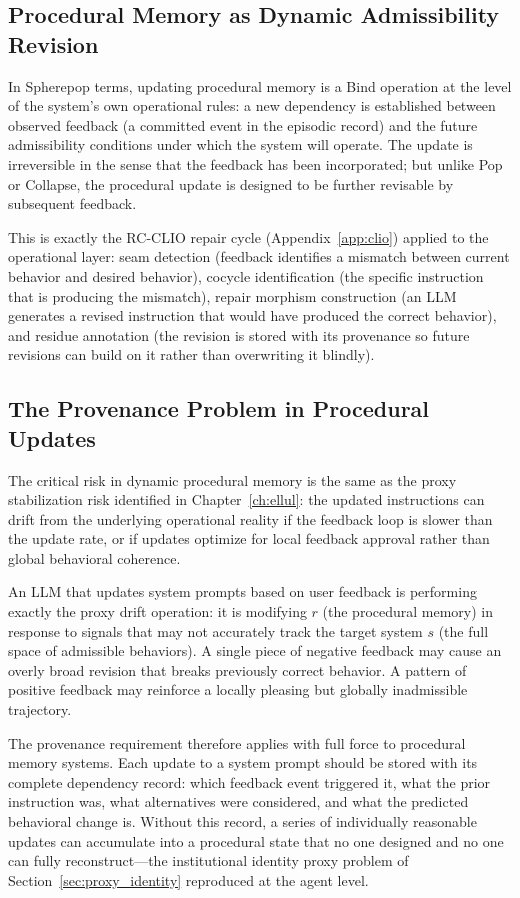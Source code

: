 \subsection{Procedural Memory as Dynamic Admissibility Revision}

In Spherepop terms, updating procedural memory is a Bind operation at the
level of the system's own operational rules: a new dependency is established
between observed feedback (a committed event in the episodic record) and the
future admissibility conditions under which the system will operate. The update
is irreversible in the sense that the feedback has been incorporated; but unlike
Pop or Collapse, the procedural update is designed to be further revisable by
subsequent feedback.

\claimH This is exactly the RC-CLIO repair cycle (Appendix~\ref{app:clio})
applied to the operational layer: seam detection (feedback identifies a mismatch
between current behavior and desired behavior), cocycle identification (the
specific instruction that is producing the mismatch), repair morphism
construction (an LLM generates a revised instruction that would have produced
the correct behavior), and residue annotation (the revision is stored with its
provenance so future revisions can build on it rather than overwriting it blindly).

\subsection{The Provenance Problem in Procedural Updates}

The critical risk in dynamic procedural memory is the same as the proxy
stabilization risk identified in Chapter~\ref{ch:ellul}: the updated
instructions can drift from the underlying operational reality if the feedback
loop is slower than the update rate, or if updates optimize for local feedback
approval rather than global behavioral coherence.

\claimP An LLM that updates system prompts based on user feedback is performing
exactly the proxy drift operation: it is modifying $r$ (the procedural memory)
in response to signals that may not accurately track the target system $s$
(the full space of admissible behaviors). A single piece of negative feedback
may cause an overly broad revision that breaks previously correct behavior.
A pattern of positive feedback may reinforce a locally pleasing but globally
inadmissible trajectory.

The provenance requirement therefore applies with full force to procedural
memory systems. Each update to a system prompt should be stored with its
complete dependency record: which feedback event triggered it, what the
prior instruction was, what alternatives were considered, and what the
predicted behavioral change is. Without this record, a series of individually
reasonable updates can accumulate into a procedural state that no one
designed and no one can fully reconstruct---the institutional identity
proxy problem of Section~\ref{sec:proxy_identity} reproduced at the
agent level.

